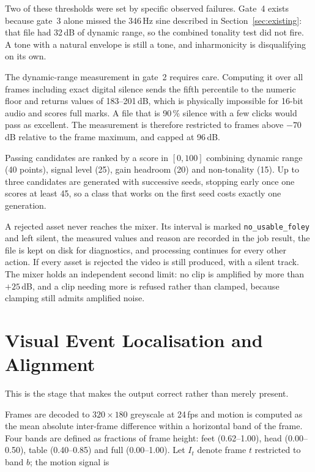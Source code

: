 \documentclass[conference]{IEEEtran}
\begin{document}
Two of these thresholds were set by specific observed failures. Gate~4 exists
because gate~3 alone missed the 346\,Hz sine described in
Section~\ref{sec:existing}: that file had 32\,dB of dynamic range, so the
combined tonality test did not fire. A tone with a natural envelope is still a
tone, and inharmonicity is disqualifying on its own.

The dynamic-range measurement in gate~2 requires care. Computing it over all
frames including exact digital silence sends the fifth percentile to the numeric
floor and returns values of 183--201\,dB, which is physically impossible for
16-bit audio and scores full marks. A file that is 90\,\% silence with a few
clicks would pass as excellent. The measurement is therefore restricted to frames
above $-70$\,dB relative to the frame maximum, and capped at 96\,dB.

Passing candidates are ranked by a score in $[0,100]$ combining dynamic range (40
points), signal level (25), gain headroom (20) and non-tonality (15). Up to three
candidates are generated with successive seeds, stopping early once one scores at
least 45, so a class that works on the first seed costs exactly one generation.

A rejected asset never reaches the mixer. Its interval is marked
\texttt{no\_usable\_foley} and left silent, the measured values and reason are
recorded in the job result, the file is kept on disk for diagnostics, and
processing continues for every other action. If every asset is rejected the video
is still produced, with a silent track. The mixer holds an independent second
limit: no clip is amplified by more than $+25$\,dB, and a clip needing more is
refused rather than clamped, because clamping still admits amplified noise.

\section{Visual Event Localisation and Alignment}

This is the stage that makes the output correct rather than merely present.

Frames are decoded to $320\times180$ greyscale at 24\,fps and motion is computed
as the mean absolute inter-frame difference within a horizontal band of the
frame. Four bands are defined as fractions of frame height: feet (0.62--1.00),
head (0.00--0.50), table (0.40--0.85) and full (0.00--1.00). Let $I_t$ denote
frame $t$ restricted to band $b$; the motion signal is
\end{document}
